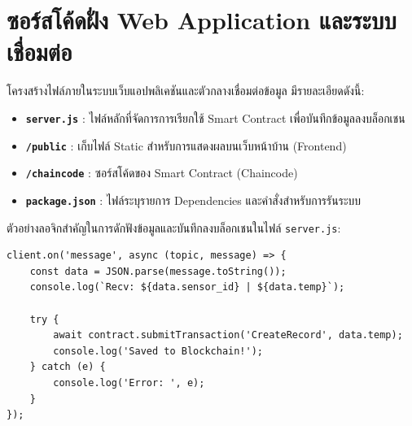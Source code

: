 \section{ซอร์สโค้ดฝั่ง Web Application และระบบเชื่อมต่อ}
โครงสร้างไฟล์ภายในระบบเว็บแอปพลิเคชันและตัวกลางเชื่อมต่อข้อมูล มีรายละเอียดดังนี้:
\begin{itemize}
    \item[] \textbf{\texttt{server.js}} : ไฟล์หลักที่จัดการการเรียกใช้ Smart Contract เพื่อบันทึกข้อมูลลงบล็อกเชน
    \item[] \textbf{\texttt{/public}} : เก็บไฟล์ Static สำหรับการแสดงผลบนเว็บหน้าบ้าน (Frontend)
    \item[] \textbf{\texttt{/chaincode}} : ซอร์สโค้ดของ Smart Contract (Chaincode)
    \item[] \textbf{\texttt{package.json}} : ไฟล์ระบุรายการ Dependencies และคำสั่งสำหรับการรันระบบ
\end{itemize}

ตัวอย่างลอจิกสำคัญในการดักฟังข้อมูลและบันทึกลงบล็อกเชนในไฟล์ \texttt{server.js}:
\begin{verbatim}
client.on('message', async (topic, message) => {
    const data = JSON.parse(message.toString());
    console.log(`Recv: ${data.sensor_id} | ${data.temp}`);

    try {
        await contract.submitTransaction('CreateRecord', data.temp);
        console.log('Saved to Blockchain!');
    } catch (e) {
        console.log('Error: ', e);
    }
});
\end{verbatim}

\newpage